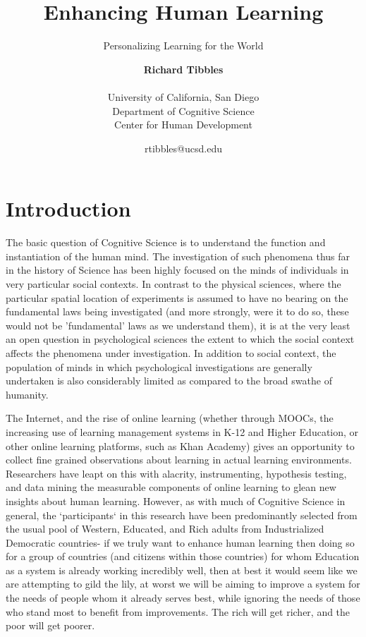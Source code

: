 \documentclass[12pt,a4paper,titlepage]{scrreprt}
\begin{document}
    \title{Enhancing Human Learning}
    \subtitle{Personalizing Learning for the World}
    \date{\small{{rtibbles}@ucsd.edu}}
    \author{{\bf Richard Tibbles} \\ \\
                \small{University of California, San Diego} \\
                \small{Department of Cognitive Science} \\
                \small{Center for Human Development}}
    \maketitle
\newpage

\tableofcontents

\newpage

\chapter{Introduction}
    
    The basic question of Cognitive Science is to understand the function and instantiation of the human mind. The investigation of such phenomena thus far in the history of Science has been highly focused on the minds of individuals in very particular social contexts. In contrast to the physical sciences, where the particular spatial location of experiments is assumed to have no bearing on the fundamental laws being investigated (and more strongly, were it to do so, these would not be 'fundamental' laws as we understand them), it is at the very least an open question in psychological sciences the extent to which the social context affects the phenomena under investigation. In addition to social context, the population of minds in which psychological investigations are generally undertaken is also considerably limited as compared to the broad swathe of humanity.

    The Internet, and the rise of online learning (whether through MOOCs, the increasing use of learning management systems in K-12 and Higher Education, or other online learning platforms, such as Khan Academy) gives an opportunity to collect fine grained observations about learning in actual learning environments. Researchers have leapt on this with alacrity, instrumenting, hypothesis testing, and data mining the measurable components of online learning to glean new insights about human learning. However, as with much of Cognitive Science in general, the `participants` in this research have been predominantly selected from the usual pool of Western, Educated, and Rich adults from Industrialized Democratic countries- if we truly want to enhance human learning then doing so for a group of countries (and citizens within those countries) for whom Education as a system is already working incredibly well, then at best it would seem like we are attempting to gild the lily, at worst we will be aiming to improve a system for the needs of people whom it already serves best, while ignoring the needs of those who stand most to benefit from improvements. The rich will get richer, and the poor will get poorer.
\end{document}
